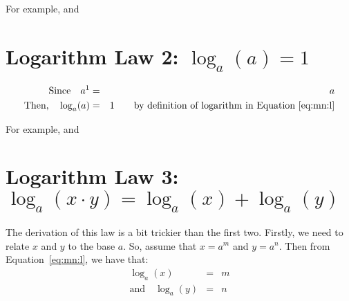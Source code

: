 For example,
and


\section{Logarithm Law 2: $\log_{a}(a) = 1$}
\begin{eqnarray*}
\mbox{Since}\quad a^1&=&a\\
\mbox{Then,}\quad \log_{a}(a) &=&1\qquad \mbox{by definition of logarithm in Equation~\ref{eq:mn:l}}
\end{eqnarray*}

For example,
and



\section{Logarithm Law 3: $\log_{a}(x\cdot y) = \log_{a}(x) + \log_{a}(y)$}
The derivation of this law is a bit trickier than the first two. Firstly, we need to relate $x$ and $y$ to the base $a$. So, assume that $x=a^m$ and $y=a^n$. Then from Equation~\ref{eq:mn:l}, we have that:
\begin{eqnarray}
\label{eq:mn:loglaw3:1}
\log_{a}(x) &=&m\\
\label{eq:mn:loglaw3:2}
\mbox{and}\quad \log_{a}(y) &=&n
\end{eqnarray}

